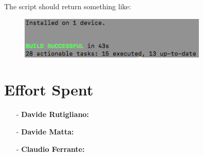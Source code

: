 \documentclass[a4paper]{article}
\begin{document}
The script should return something like:
\begin{figure}[!htpb]
    \centering
    \includegraphics[width=0.8\textwidth, keepaspectratio]{ITD/images/gradle.png}
\end{figure}

\newpage
\section{Effort Spent}
    \begin{itemize}
        \item[-] \textbf{Davide Rutigliano: }
        
        \item[-] \textbf{Davide Matta: }
        
        \item[-] \textbf{Claudio Ferrante: }
    \end{itemize}
\end{document}
